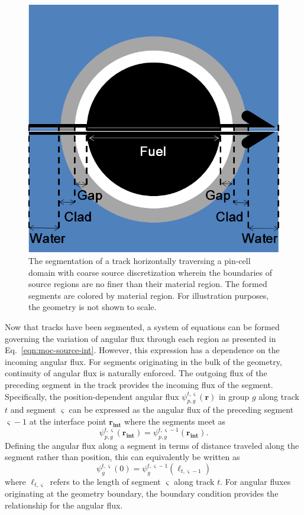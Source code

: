 \begin{figure}[h!]
	\centering
	\includegraphics[width=0.6\linewidth]{figures/segmentation.PNG}
	\caption[]{The segmentation of a track horizontally traversing a pin-cell domain with coarse source discretization wherein the boundaries of source regions are no finer than their material region. The formed segments are colored by material region. For illustration purposes, the geometry is not shown to scale.}
	\label{fig:segmentation}
\end{figure}

Now that tracks have been segmented, a system of equations can be formed governing the variation of angular flux through each region as presented in Eq.~\ref{eqn:moc-source-int}. However, this expression has a dependence on the incoming angular flux. For segments originating in the bulk of the geometry, continuity of angular flux is naturally enforced. The outgoing flux of the preceding segment in the track provides the incoming flux of the segment. Specifically, the position-dependent angular flux $\psi_{p,g}^{t,\varsigma}(\mathbf{r})$ in group $g$ along track $t$ and segment $\varsigma$ can be expressed as the angular flux of the preceding segment $\varsigma-1$ at the interface point $\mathbf{r_{\textbf{int}}}$ where the segments meet as
\begin{dmath}
	\psi_{p,g}^{t,\varsigma}(\mathbf{r_{\textbf{int}}}) = \psi_{p,g}^{t,\varsigma-1}(\mathbf{r_{\textbf{int}}}).
\end{dmath}
Defining the angular flux along a segment in terms of distance traveled along the segment rather than position, this can equivalently be written as
\begin{dmath}
	\psi_g^{t,\varsigma}(0) = \psi_g^{t,\varsigma-1}(\ell_{t,\varsigma-1})
	\label{eqn:angular_flux_boundary}
\end{dmath}
where $\ell_{t,\varsigma}$ refers to the length of segment $\varsigma$ along track $t$. For angular fluxes originating at the geometry boundary, the boundary condition provides the relationship for the angular flux. 

